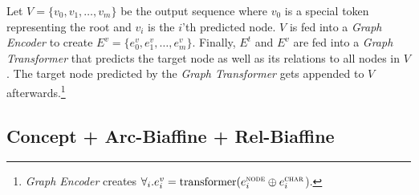 \documentclass[11pt,a4paper]{article}
\begin{document}
\noindent Let $V = \{v_0, v_1, \ldots, v_m\}$ be the output sequence where $v_0$ is a special token representing the root and $v_i$ is the $i$'th predicted node.
$V$ is fed into a \textit{Graph Encoder} to create $E^v = \{e^v_0, e^v_1, \ldots, e^v_{m}\}$.
Finally, $E^t$ and $E^v$ are fed into a \textit{Graph Transformer} that predicts the target node as well as its relations to all nodes in $V$.
The target node predicted by the \textit{Graph Transformer} gets appended to $V$ afterwards.\footnote{\textit{Graph Encoder} creates $\forall_i. e^v_i = \text{transformer}(e^{\textsc{node}}_i \oplus e^{\textsc{char}}_i$).}




\subsection{Concept + Arc-Biaffine + Rel-Biaffine}
\label{ssec:concept-biaffine}
\end{document}
